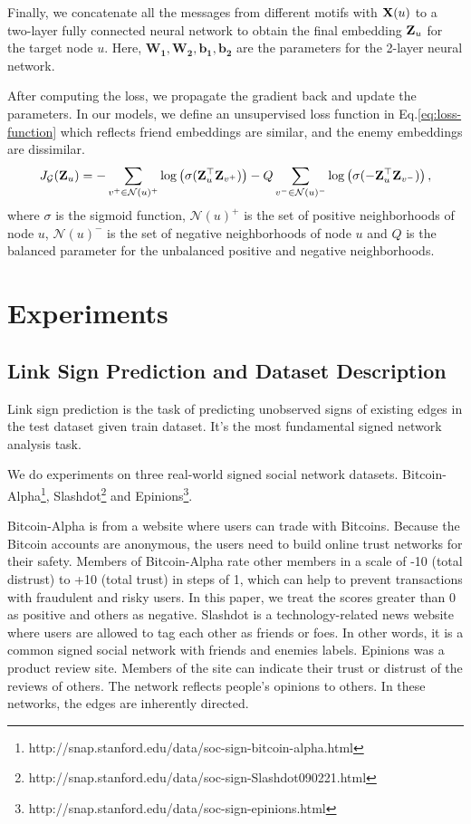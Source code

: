 \documentclass[runningheads]{llncs}
\begin{document}
Finally, we concatenate all the messages from different motifs with $\mathbf{X}(u)$ to a two-layer fully connected neural network to obtain the final embedding $\mathbf{Z}_u$ for the target node $u$.
Here, $\mathbf{W_1}, \mathbf{W_2}, \mathbf{b_1}, \mathbf{b_2}$ are the parameters for the 2-layer neural network.

After computing the loss, we propagate the gradient back and update the parameters.
In our models, we define an unsupervised loss function in Eq.\ref{eq:loss-function} which reflects friend embeddings are similar, and the enemy embeddings are dissimilar. 
\begin{equation}\label{eq:loss-function}
    J_{\mathcal{G}}(\mathbf{Z}_u) = -\sum_{v^+\in \mathcal{N}(u)^+}\log\left(\sigma(\mathbf{Z}^\top_u\mathbf{Z}_{v^+}) \right) - Q\sum_{v^-\in \mathcal{N}(u)^-}\log\left(\sigma(-\mathbf{Z}^\top_u\mathbf{Z}_{v^-})\right),
\end{equation}
where $\sigma$ is the sigmoid function, $\mathcal{N}(u)^+$ is the set of positive neighborhoods of node $u$, $\mathcal{N}(u)^-$ is the set of negative neighborhoods of node $u$ and $Q$ is the balanced parameter for the unbalanced positive and negative neighborhoods.
 
\section{Experiments}\label{sec:experiments}
\subsection{Link Sign Prediction and Dataset Description}
Link sign prediction is the task of predicting unobserved signs of existing edges in the test dataset given train dataset. It's the most fundamental signed network analysis task\cite{leskovec2010predicting}.

We do experiments on three real-world signed social network datasets. \eg Bitcoin-Alpha\footnote{http://snap.stanford.edu/data/soc-sign-bitcoin-alpha.html}, Slashdot\footnote{http://snap.stanford.edu/data/soc-sign-Slashdot090221.html} and Epinions\footnote{http://snap.stanford.edu/data/soc-sign-epinions.html}. 

Bitcoin-Alpha\cite{kumar2016edge} is from a website where users can trade with Bitcoins. Because the Bitcoin accounts are anonymous, the users need to build online trust networks for their safety. Members of Bitcoin-Alpha rate other members in a scale of -10 (total distrust) to +10 (total trust) in steps of 1, which can help to prevent transactions with fraudulent and risky users. In this paper, we treat the scores greater than 0 as positive and others as negative. 
Slashdot\cite{leskovec2010signed} is a technology-related news website where users are allowed to tag each other as friends or foes. In other words, it is a common signed social network with friends and enemies labels.
Epinions\cite{leskovec2010signed} was a product review site. Members of the site can indicate their trust or distrust of the reviews of others. The network reflects people's opinions to others.
In these networks, the edges are inherently directed\cite{leskovec2010signed}.
\end{document}
